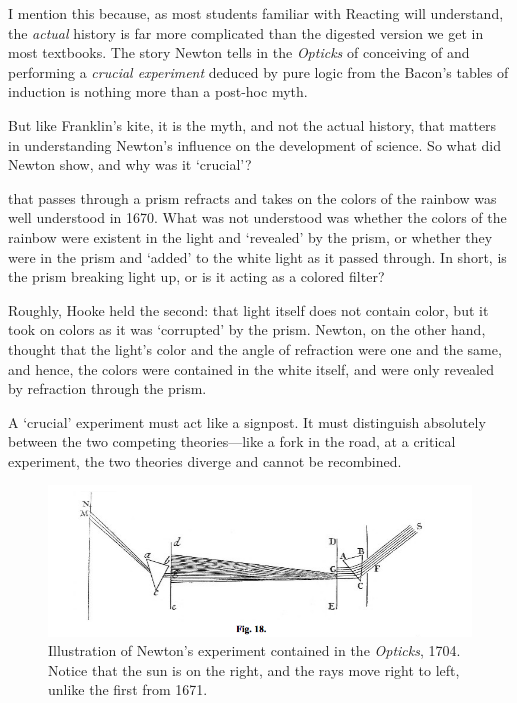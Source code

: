 \begin{refsection}
I mention this because, as most students familiar with Reacting will understand, the \emph{actual} history is far more complicated than the digested version we get in most textbooks. The story Newton tells in the \emph{Opticks} of conceiving of and performing a \emph{crucial experiment} deduced by pure logic from the Bacon’s tables of induction is nothing more than a post-hoc myth.

But like Franklin’s kite, it is the myth, and not the actual history, that matters in understanding Newton’s influence on the development of science. So what did Newton show, and why was it ‘crucial’?

 that passes through a prism refracts and takes on the colors of the rainbow was well understood in 1670. What was not understood was whether the colors of the rainbow were existent in the light and ‘revealed’ by the prism, or whether they were in the prism and ‘added’ to the white light as it passed through. In short, is the prism breaking light up, or is it acting as a colored filter?

Roughly, Hooke held the second: that light itself does not contain color, but it took on colors as it was ‘corrupted’ by the prism. Newton, on the other hand, thought that the light’s color and the angle of refraction were one and the same, and hence, the colors were contained in the white itself, and were only revealed by refraction through the prism.

A ‘crucial’ experiment must act like a signpost. It must distinguish absolutely between the two competing theories---like a fork in the road, at a critical experiment, the two theories diverge and cannot be recombined.
\begin{figure}\includegraphics{../images/newton1704.png}\caption{Illustration of Newton's experiment contained in the \emph{Opticks}, 1704. Notice that the sun is on the right, and the rays move right to left, unlike the first from 1671.}\label{fig:newton1704}\end{figure}


\end{refsection}
